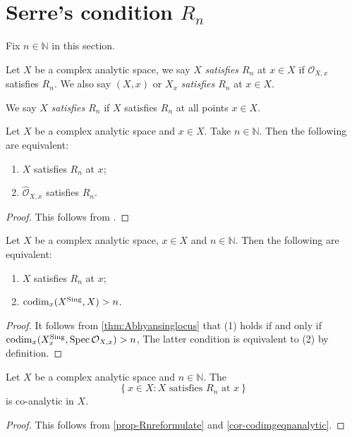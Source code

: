 \section{Serre's condition \texorpdfstring{$R_n$}{Rn}}
Fix $n\in \mathbb{N}$ in this section.
\begin{definition}
    Let $X$ be a complex analytic space, we say $X$ \emph{satisfies $R_n$} at $x\in X$ if $\mathcal{O}_{X,x}$ satisfies $R_n$. We also say $(X,x)$ or $X_x$  \emph{satisfies $R_n$} at $x\in X$.

    We say $X$  \emph{satisfies $R_n$} if $X$ satisfies $R_n$ at all points $x\in X$. 
\end{definition}

\begin{proposition}\label{prop-Rncompletion}
    Let $X$ be a complex analytic space and $x\in X$. Take $n\in \mathbb{N}$. Then the following are equivalent:
    \begin{enumerate}
        \item $X$ satisfies $R_n$ at $x$;
        \item $\hat{\mathcal{O}}_{X,x}$ satisfies $R_n$.
    \end{enumerate}
\end{proposition}
\begin{proof}
    This follows from \cite[\href{https://stacks.math.columbia.edu/tag/07NY}{Tag 07NY}]{stacks-project}.
\end{proof}

\begin{proposition}\label{prop-Rnreformulate}
    Let $X$ be a complex analytic space, $x\in X$ and $n\in \mathbb{N}$. Then the following are equivalent:
    \begin{enumerate}
        \item $X$ satisfies $R_n$ at $x$;
        \item $\operatorname{codim}_x(X^{\operatorname{Sing}},X)>n$.
    \end{enumerate}
\end{proposition}
\begin{proof}
    It follows from \cref{thm:Abhyansinglocus} that (1) holds if and only if $\operatorname{codim}_x(X^{\operatorname{Sing}}_x,\operatorname{Spec} \mathcal{O}_{X,x})>n$, The latter condition is equivalent to (2) by definition.
\end{proof}

\begin{corollary}\label{cor-Rnlocuscoana}
    Let $X$ be a complex analytic space and $n\in \mathbb{N}$. The 
    \[
        \left\{x\in X: X\text{ satisfies }R_n \text{ at }x \right\}  
    \]
    is co-analytic in $X$.
\end{corollary}
\begin{proof}
    This follows from \cref{prop-Rnreformulate} and \cref{cor-codimgeqnanalytic}.
\end{proof}


